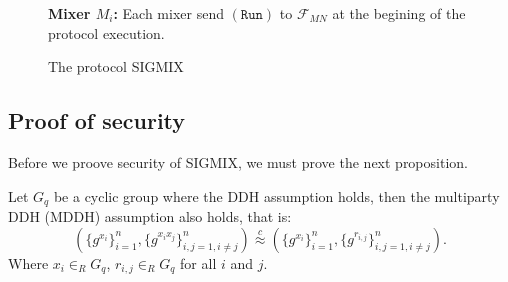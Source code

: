 \documentclass{acm_proc_article-sp}
\begin{document}
\begin{figure}
{\begin{minipage}[t]{1\columnwidth}
\textbf{Mixer $M_i$:} Each mixer send $(\texttt{Run})$ to $\mathcal{F}_{MN}$ at the begining
of the protocol execution. 

\end{minipage}}
\caption{The protocol SIGMIX}
\label{SIGMIX}
\end{figure}

\subsection{Proof of security}

Before we proove security of SIGMIX, we must prove the next proposition.

\begin{proposition}
Let $G_q$ be a cyclic group where the DDH assumption holds, then the multiparty
DDH (MDDH) assumption also holds, that is:
$$
(\{g^{x_i}\}_{i=1}^n, \{g^{x_ix_j}\}_{i,j=1, i\neq j}^n)
\overset{c}{\approx}
(\{g^{x_i}\}_{i=1}^n, \{g^{r_{i,j}}\}_{i,j=1, i\neq j}^n).
$$
Where $x_i\in_R G_q$, $r_{i,j} \in_R G_q$ for all $i$ and $j$.
\label{prop:mddh}
\end{proposition}
\end{document}
